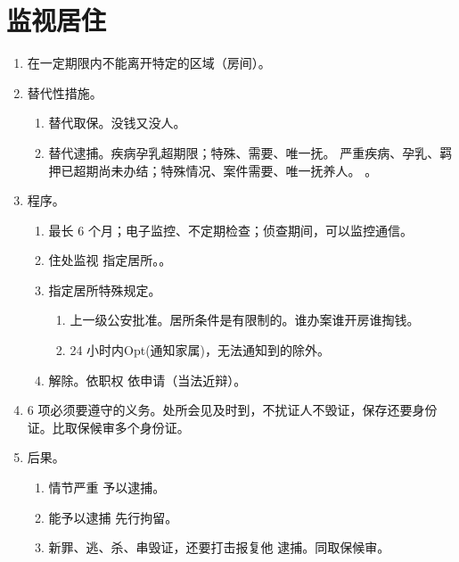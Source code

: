 \section{监视居住}
\begin{enumerate}
  \item 在一定期限内不能离开特定的区域（房间）。
  \item 替代性措施。
        \begin{enumerate}
          \item 替代取保。没钱又没人。
          \item 替代逮捕。疾病孕乳超期限；特殊、需要、唯一抚。
                严重疾病、孕乳、羁押已超期尚未办结；特殊情况、案件需要、唯一抚养人。
                。
        \end{enumerate}
  \item 程序。
        \begin{enumerate}
          \item 最长 6 个月；电子监控、不定期检查；侦查期间，可以监控通信。
          \item 住处监视 \hz 指定居所。。
          \item 指定居所特殊规定。
                \begin{enumerate}
                  \item 上一级公安批准。居所条件是有限制的。谁办案谁开房谁掏钱。
                  \item 24 小时内Opt(通知家属)，无法通知到的除外。
                \end{enumerate}
          \item 解除。依职权 \hz 依申请（当法近辩）。
        \end{enumerate}
  \item 6 项必须要遵守的义务。处所会见及时到，不扰证人不毁证，保存还要身份证。比取保候审多个身份证。
  \item 后果。
        \begin{enumerate}
          \item 情节严重 \yjt 予以逮捕。
          \item 能予以逮捕  \yjt 先行拘留。
          \item 新罪、逃、杀、串毁证，还要打击报复他 \yjt 逮捕。同取保候审。
        \end{enumerate}
\end{enumerate}

